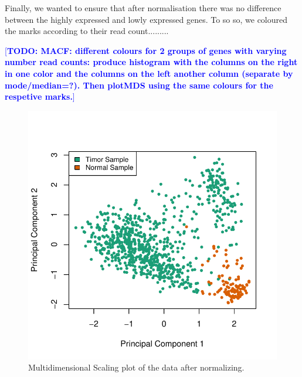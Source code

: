 \documentclass[10pt,twocolumn]{article}\usepackage[]{graphicx}\usepackage[]{color}
\makeatletter
\def\maxwidth{ %
  \ifdim\Gin@nat@width>\linewidth
    \linewidth
  \else
    \Gin@nat@width
  \fi
}
\newenvironment{knitrout}{}{} %
\newcommand{\todo}[1]{\textcolor{blue}{[\textbf{TODO: #1}]} }
\makeatother
\begin{document}
Finally, we wanted to ensure that after normalisation there was no difference between the highly expressed and lowly expressed genes. To so so, we coloured the marks according to their read count.........

\todo{MACF: different colours for 2 groups of genes with varying number read counts: produce histogram with the columns on the right in one color and the columns on the left another column (separate by mode/median=?). Then plotMDS using the same colours for the respetive marks.}

\begin{knitrout}
\color{fgcolor}\begin{figure}[ht]

{\centering \includegraphics[width=\maxwidth]{figure/mds-1} 

}

\caption[Multidimensional Scaling plot of the data after normalizing]{Multidimensional Scaling plot of the data after normalizing.}\label{fig:mds}
\end{figure}


\end{knitrout}
\end{document}
